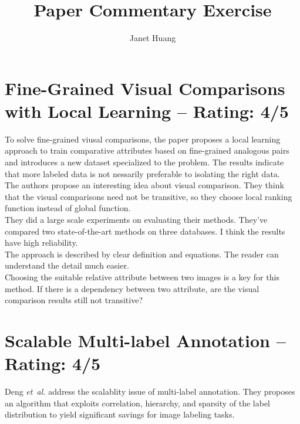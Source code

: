 \documentclass[a4paper]{article}
\title{Paper Commentary Exercise}
\author{Janet Huang}
\begin{document}
\maketitle




\section{Fine-Grained Visual Comparisons with Local Learning -- Rating: 4/5}
To solve fine-grained viusal comparisons, the paper \cite{fine-grained} proposes a local learning approach to train comparative attributes based on fine-grained analogous pairs and introduces a new dataset specialized to the problem. The results indicate that more labeled data is not nessarily preferable to isolating the right data. \\

The authors propose an interesting idea about visual comparison. They think that the visual comparisons need not be transitive, so they choose local ranking function instead of global function. \\

They did a large scale experiments on evaluating their methods. They've compared two state-of-the-art methods on three databases. I think the results have high reliability. \\

The approach is described by clear definition and equations. The reader can understand the detail much easier. \\

Choosing the suitable relative attribute between two images is a key for this method. If there is a dependency between two attribute, are the visual comparison results still not transitive?

\section{Scalable Multi-label Annotation -- Rating: 4/5}
Deng \emph{et~al.} \cite{Deng2014} address the scalablity issue of multi-label annotation. They proposes an algorithm that exploits correlation, hierarchy, and sparsity of the label distribution to yield significant savings for image labeling tasks.\\
\end{document}
